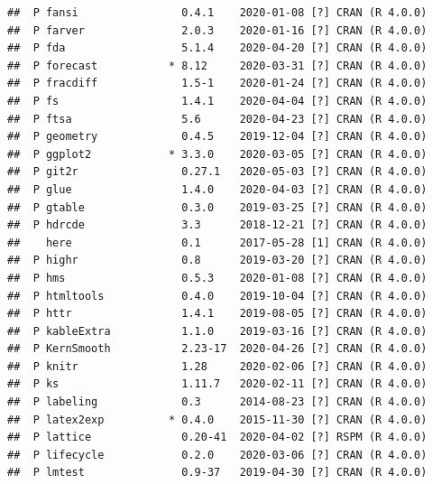 \documentclass[11pt,a4paper,]{article}
\begin{document}
\begin{verbatim}
##  P fansi                0.4.1    2020-01-08 [?] CRAN (R 4.0.0)                                 
##  P farver               2.0.3    2020-01-16 [?] CRAN (R 4.0.0)                                 
##  P fda                  5.1.4    2020-04-20 [?] CRAN (R 4.0.0)                                 
##  P forecast           * 8.12     2020-03-31 [?] CRAN (R 4.0.0)                                 
##  P fracdiff             1.5-1    2020-01-24 [?] CRAN (R 4.0.0)                                 
##  P fs                   1.4.1    2020-04-04 [?] CRAN (R 4.0.0)                                 
##  P ftsa                 5.6      2020-04-23 [?] CRAN (R 4.0.0)                                 
##  P geometry             0.4.5    2019-12-04 [?] CRAN (R 4.0.0)                                 
##  P ggplot2            * 3.3.0    2020-03-05 [?] CRAN (R 4.0.0)                                 
##  P git2r                0.27.1   2020-05-03 [?] CRAN (R 4.0.0)                                 
##  P glue                 1.4.0    2020-04-03 [?] CRAN (R 4.0.0)                                 
##  P gtable               0.3.0    2019-03-25 [?] CRAN (R 4.0.0)                                 
##  P hdrcde               3.3      2018-12-21 [?] CRAN (R 4.0.0)                                 
##    here                 0.1      2017-05-28 [1] CRAN (R 4.0.0)                                 
##  P highr                0.8      2019-03-20 [?] CRAN (R 4.0.0)                                 
##  P hms                  0.5.3    2020-01-08 [?] CRAN (R 4.0.0)                                 
##  P htmltools            0.4.0    2019-10-04 [?] CRAN (R 4.0.0)                                 
##  P httr                 1.4.1    2019-08-05 [?] CRAN (R 4.0.0)                                 
##  P kableExtra           1.1.0    2019-03-16 [?] CRAN (R 4.0.0)                                 
##  P KernSmooth           2.23-17  2020-04-26 [?] CRAN (R 4.0.0)                                 
##  P knitr                1.28     2020-02-06 [?] CRAN (R 4.0.0)                                 
##  P ks                   1.11.7   2020-02-11 [?] CRAN (R 4.0.0)                                 
##  P labeling             0.3      2014-08-23 [?] CRAN (R 4.0.0)                                 
##  P latex2exp          * 0.4.0    2015-11-30 [?] CRAN (R 4.0.0)                                 
##  P lattice              0.20-41  2020-04-02 [?] RSPM (R 4.0.0)                                 
##  P lifecycle            0.2.0    2020-03-06 [?] CRAN (R 4.0.0)                                 
##  P lmtest               0.9-37   2019-04-30 [?] CRAN (R 4.0.0)                                 

\end{verbatim}
\end{document}
